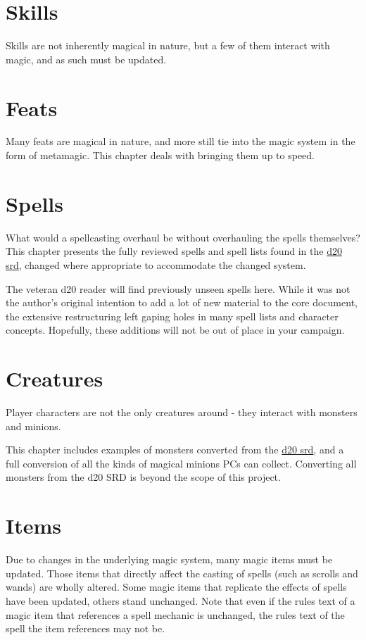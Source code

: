 \documentclass[a4paper,10pt]{article}
\begin{document}
\begin{multicols}{2}
\part{Skills}
Skills are not inherently magical in nature, but a few of them interact with magic, and as such must be updated.


\part{Feats}
Many feats are magical in nature, and more still tie into the magic system in the form of metamagic. This chapter deals with bringing them up to speed.


\part{Spells}
What would a spellcasting overhaul be without overhauling the spells themselves? This chapter presents the fully reviewed spells and spell lists found in the \href{http://www.wizards.com/default.asp?x=d20/article/srd35}{d20 srd}, changed where appropriate to accommodate the changed system.

The veteran d20 reader will find previously unseen spells here. While it was not the author's original intention to add a lot of new material to the core document, the extensive restructuring left gaping holes in many spell lists and character concepts. Hopefully, these additions will not be out of place in your campaign.
\newpage

\part{Creatures}
Player characters are not the only creatures around - they interact with monsters and minions.

This chapter includes examples of monsters converted from the \href{http://www.wizards.com/default.asp?x=d20/article/srd35}{d20 srd}, and a full conversion of all the kinds of magical minions PCs can collect. Converting all monsters from the d20 SRD is beyond the scope of this project.
\newpage

\part{Items}
Due to changes in the underlying magic system, many magic items must be updated.
Those items that directly affect the casting of spells (such as scrolls and wands) are wholly altered.
Some magic items that replicate the effects of spells have been updated, others stand unchanged.
Note that even if the rules text of a magic item that references a spell mechanic is unchanged, the rules text of the spell the item references may not be.


\end{multicols}
\end{document}
